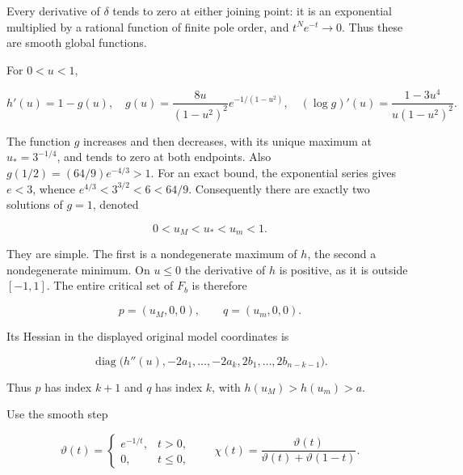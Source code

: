 Every derivative of \(\delta\) tends to zero at either joining point: it is an exponential multiplied by a rational function of finite pole order, and \(t^N e^{-t}\to0\). Thus these are smooth global functions.

For \(0<u<1\),

\begin{equation}
h'(u)=1-g(u),\quad
 g(u)=\frac{8u}{(1-u^2)^2}e^{-1/(1-u^2)},\quad
 (\log g)'(u)=\frac{1-3u^4}{u(1-u^2)^2}.
 \label{courseIII:creating-an-original-cancelling-handle-pair:eq:1.3}
\end{equation}

The function \(g\) increases and then decreases, with its unique maximum at \(u_*=3^{-1/4}\), and tends to zero at both endpoints. Also \(g(1/2)=(64/9)e^{-4/3}>1\). For an exact bound, the exponential series gives \(e<3\), whence \(e^{4/3}<3^{3/2}<6<64/9\). Consequently there are exactly two solutions of \(g=1\), denoted

\begin{equation}
0<u_M<u_*<u_m<1.
 \label{courseIII:creating-an-original-cancelling-handle-pair:eq:1.4}
\end{equation}

They are simple. The first is a nondegenerate maximum of \(h\), the second a nondegenerate minimum. On \(u\leq0\) the derivative of \(h\) is positive, as it is outside \([-1,1]\). The entire critical set of \(F_b\) is therefore

\begin{equation}
p=(u_M,0,0),\qquad q=(u_m,0,0).
 \label{courseIII:creating-an-original-cancelling-handle-pair:eq:1.5}
\end{equation}

Its Hessian in the displayed original model coordinates is

\begin{equation}
\operatorname{diag}\bigl(h''(u),-2a_1,\ldots,-2a_k,
                    2b_1,\ldots,2b_{n-k-1}\bigr).
 \label{courseIII:creating-an-original-cancelling-handle-pair:eq:1.6}
\end{equation}

Thus \(p\) has index \(k+1\) and \(q\) has index \(k\), with \(h(u_M)>h(u_m)>a\).

Use the smooth step

\begin{equation}
\vartheta(t)=
 \begin{cases}e^{-1/t},&t>0,\\0,&t\leq0,\end{cases}
 \qquad
 \chi(t)=\frac{\vartheta(t)}{\vartheta(t)+\vartheta(1-t)}.
 \label{courseIII:creating-an-original-cancelling-handle-pair:eq:1.7}
\end{equation}

